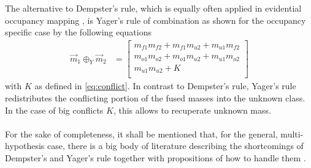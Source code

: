 The alternative to Dempster's rule, which is equally often applied in evidential occupancy mapping \cite{wirges2018evidential,kurdej2012map,reineking2013evidential}, is Yager's rule of combination \cite{yager1987dempster} as shown for the occupancy specific case by the following equations
\begin{align}
	\label{eq:yagers_rule}
	\vec{m}_1 \oplus_Y \vec{m}_2 &=  
	\begin{bmatrix} 
		m_{f1}m_{f2} + m_{f1}m_{u2} + m_{u1}m_{f2}\\
		m_{o1}m_{o2} + m_{o1}m_{u2} + m_{u1}m_{o2}\\
		m_{u1}m_{u2} + K\\
	\end{bmatrix}
\end{align}
with $K$ as defined in \eqref{eq:conflict}. In contrast to Dempster's rule, Yager's rule redistributes the conflicting portion of the fused masses into the unknown class. In the case of big conflicts $K$, this allows to recuperate unknown mass.
\\\\
For the sake of completeness, it shall be mentioned that, for the general, multi-hypothesis case, there is a big body of literature describing the shortcomings of Dempster's and Yager's rule together with propositions of how to handle them \cite{zadeh1979validity,han2008modified,yang2013evidential,zhang2020new}. 
%

